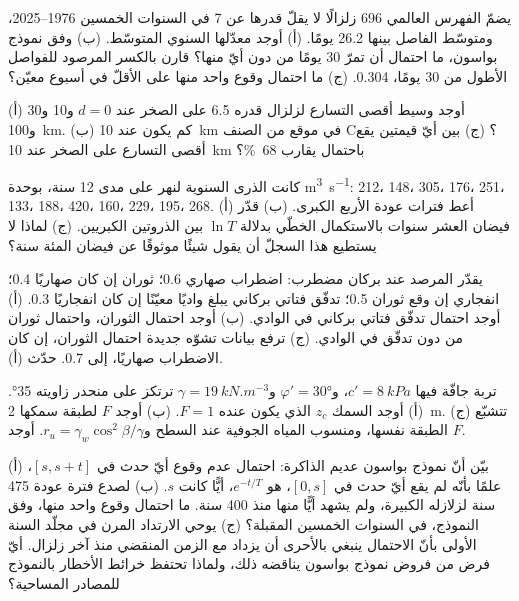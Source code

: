 \begin{exercise}[$\star\star$]\label{exo:b2:geological-hazards:5}
يضمّ الفهرس العالمي 696 زلزالًا لا يقلّ قدرها عن 7 في السنوات الخمسين 1976--2025،
ومتوسّط الفاصل بينها 26.2 يومًا. (أ) أوجد معدّلها السنوي المتوسّط. (ب) وفق نموذج
بواسون، ما احتمال أن تمرّ 30 يومًا من دون أيّ منها؟ قارن بالكسر المرصود
للفواصل الأطول من 30 يومًا، 0.304. (ج) ما احتمال وقوع واحد منها على الأقلّ في
أسبوع معيّن؟
\end{exercise}

\begin{exercise}[$\star\star$]\label{exo:b2:geological-hazards:6}
(أ) أوجد وسيط أقصى التسارع لزلزال قدره 6.5 على الصخر عند $d = 0$ و10 و30
و\qty{100}{km}. (ب) كم يكون عند \qty{10}{km} في موقع من الصنف C؟ (ج) بين أيّ قيمتين
يقع أقصى التسارع على الصخر عند \qty{10}{km} باحتمال يقارب \qty{68}{\percent}؟
\end{exercise}

\begin{exercise}[$\star\star$]\label{exo:b2:geological-hazards:7}
كانت الذرى السنوية لنهر على مدى 12 سنة، بوحدة \unit{m^3.s^{-1}}: 212، 148، 305، 176، 251، 133، 188،
420، 160، 229، 195، 268. (أ) أعط فترات عودة الأربع الكبرى. (ب) قدّر فيضان العشر
سنوات بالاستكمال الخطّي بدلالة $\ln T$ بين الذروتين الكبريين. (ج) لماذا لا يستطيع هذا السجلّ أن يقول
شيئًا موثوقًا عن فيضان المئة سنة؟
\end{exercise}

\begin{exercise}[$\star\star$]\label{exo:b2:geological-hazards:8}
يقدّر المرصد عند بركان مضطرب: اضطراب صهاري 0.6؛ ثوران إن كان صهاريًا 0.4؛
انفجاري إن وقع ثوران 0.5؛ تدفّق فتاتي بركاني يبلغ واديًا معيّنًا إن كان انفجاريًا 0.3. (أ) أوجد
احتمال تدفّق فتاتي بركاني في الوادي. (ب) أوجد احتمال الثوران، واحتمال
ثوران من دون تدفّق في الوادي. (ج) ترفع بيانات تشوّه جديدة احتمال
الثوران، إن كان الاضطراب صهاريًا، إلى 0.7. حدّث (أ).
\end{exercise}

\begin{exercise}[$\star\star$]\label{exo:b2:geological-hazards:9}
تربة جافّة فيها $c' = \qty{8}{kPa}$، و$\varphi' = \ang{30}$ و$\gamma = \qty{19}{kN.m^{-3}}$ ترتكز على
منحدر زاويته \ang{35}. (أ) أوجد السمك $z_c$ الذي يكون عنده $F = 1$. (ب) أوجد $F$ لطبقة
سمكها \qty{2}{m}. (ج) تتشبّع الطبقة نفسها، ومنسوب المياه الجوفية عند السطح
و$r_u = \gamma_w\cos^2\beta/\gamma$. أوجد $F$.
\end{exercise}

\begin{exercise}[$\star\star\star$]\label{exo:b2:geological-hazards:10}
(أ) بيّن أنّ نموذج بواسون عديم الذاكرة: احتمال عدم وقوع أيّ حدث في $[s, s + t]$، علمًا بأنّه
لم يقع أيّ حدث في $[0, s]$، هو $e^{-t/T}$، أيًّا كانت $s$. (ب) لصدع فترة عودة 475 سنة
لزلازله الكبيرة، ولم يشهد أيًّا منها منذ 400 سنة. ما احتمال وقوع واحد منها، وفق النموذج،
في السنوات الخمسين المقبلة؟ (ج) يوحي الارتداد المرن في مجلّد السنة الأولى بأنّ الاحتمال
ينبغي بالأحرى أن يزداد مع الزمن المنقضي منذ آخر زلزال. أيّ فرض من فروض نموذج بواسون
يناقضه ذلك، ولماذا تحتفظ خرائط الأخطار بالنموذج للمصادر المساحية؟
\end{exercise}

